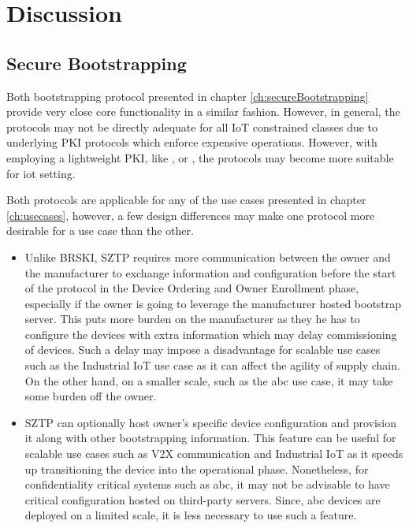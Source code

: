 \chapter{Discussion}
\label{ch:discussion}

\section{Secure Bootstrapping}
Both bootstrapping protocol presented in chapter \ref{ch:secureBootstrapping} provide very close core functionality in a similar fashion. However, in general, the protocols may not be directly adequate for all IoT constrained classes due to underlying PKI protocols which enforce expensive operations. However, with employing a lightweight PKI, like \cite{hoglund2020pki4iot}, or \cite{won2018decentralized}, the protocols may become more suitable for \gls{iot} setting. 
\par
Both protocols are applicable for any of the use cases presented in chapter \ref{ch:usecases}, however, a few design differences may make one protocol more desirable for a use case than the other. 
\begin{itemize}
	\item Unlike BRSKI, SZTP requires more communication between the owner and the manufacturer to exchange information and configuration before the start of the protocol in the Device Ordering and Owner Enrollment phase, especially if the owner is going to leverage the manufacturer hosted bootstrap server. This puts more burden on the manufacturer as they he has to configure the devices with extra information which may delay commissioning of devices. Such a delay may impose a disadvantage for scalable use cases such as the Industrial IoT use case as it can affect the agility of supply chain. On the other hand, on a smaller scale, such as the \gls{abc} use case, it may take some burden off the owner.
	
	\item SZTP can optionally host owner's specific device configuration and provision it along with other bootstrapping information. This feature can be useful for scalable use cases such as V2X communication and Industrial IoT as it speeds up transitioning the device into the operational phase. Nonetheless, for confidentiality critical systems such as \gls{abc}, it may not be advisable to have critical configuration hosted on third-party servers. Since, \gls{abc} devices are deployed on a limited scale, it is less necessary to use such a feature.
\end{itemize}

